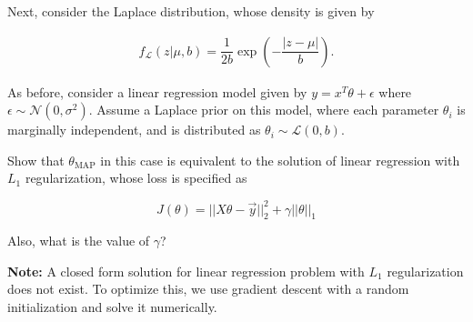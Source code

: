 \item {} Next, consider the Laplace distribution, whose density is
given by

\begin{align*}
  f_{\mathcal{L}}(z|\mu ,b)={\dfrac{1}{2b}}
  \exp \left(-{\dfrac{|z-\mu |}{b}}\right).
\end{align*}


As before, consider a linear regression model given by
$y=x^T\theta+\epsilon$ where $\epsilon \sim \mathcal{N}(0,\sigma^2)$. Assume a Laplace
prior on this model, where each parameter $\theta_i$ is marginally independent, and
is distributed as $\theta_i \sim \mathcal{L}(0,b)$.

Show that $\theta_\text{MAP}$ in this case is equivalent to the solution of linear
regression with $L_1$ regularization, whose loss is specified as

$$J(\theta) = || X\theta - \vec{y} ||_2^2 + \gamma ||\theta||_1 $$

Also, what is the value of $\gamma$?

\ifnum{} {
  
} \fi


\textbf{Note:} A closed form solution for linear regression problem with $L_1$ regularization
does not exist. To optimize this, we use gradient descent with a random initialization
and solve it numerically.
